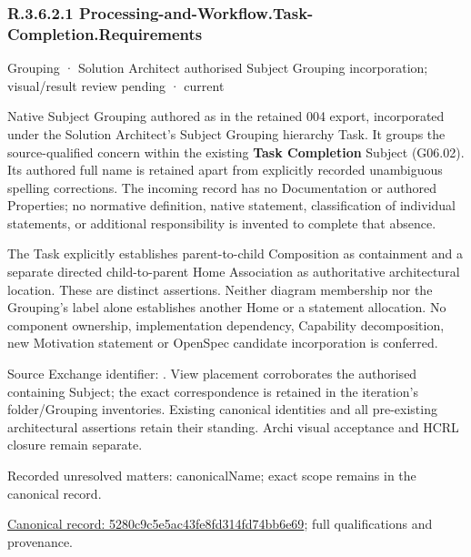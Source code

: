 \subsubsection*{R.3.6.2.1 Processing-and-Workflow.Task-Completion.Requirements}
\label{navigation:R.3.6.2.1}

\label{element:5280c9c5e5ac43fe8fd314fd74bb6e69}
{\small Grouping · Solution Architect authorised Subject Grouping incorporation; visual/result review pending · current}\par

Native Subject Grouping authored as \texttt{} in the retained 004 export,
incorporated under the Solution Architect's Subject Grouping hierarchy Task.
It groups the source-qualified \texttt{} concern within
the existing \textbf{Task Completion} Subject (G06.02). Its authored full name
is retained apart from explicitly recorded unambiguous spelling corrections.
The incoming record has no Documentation or authored Properties; no normative
definition, native statement, classification of individual statements, or
additional responsibility is invented to complete that absence.



The Task explicitly establishes parent-to-child Composition as containment and
a separate directed child-to-parent Home Association as authoritative architectural
location. These are distinct assertions. Neither diagram membership nor the
Grouping's label alone establishes another Home or a statement allocation.
No component ownership, implementation dependency, Capability decomposition,
new Motivation statement or OpenSpec candidate incorporation is conferred.



Source Exchange identifier: \texttt{}. View placement corroborates
the authorised containing Subject; the exact correspondence is retained in the
iteration's folder/Grouping inventories. Existing canonical identities and all
pre-existing architectural assertions retain their standing. Archi visual
acceptance and HCRL closure remain separate.


{\small Recorded unresolved matters: canonicalName; exact scope remains in the canonical record.}\par
{\footnotesize \href{../../../../continuum/grouping/5280c9c5e5ac43fe8fd314fd74bb6e69.md}{Canonical record: 5280c9c5e5ac43fe8fd314fd74bb6e69}; full qualifications and provenance.}\par
